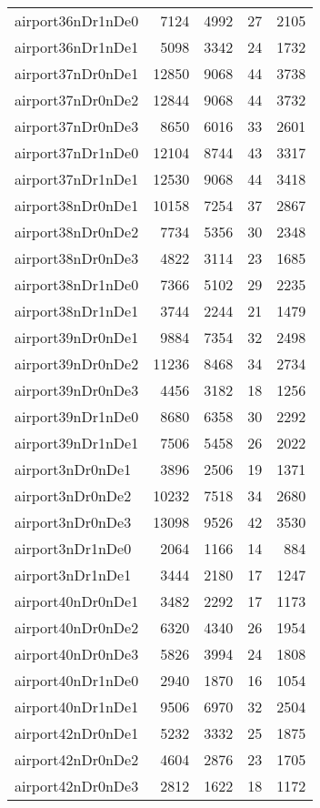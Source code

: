 \begin{tabular}{lrrrr}
airport36nDr1nDe0 & 7124 & 4992 & 27 & 2105 \\
airport36nDr1nDe1 & 5098 & 3342 & 24 & 1732 \\
airport37nDr0nDe1 & 12850 & 9068 & 44 & 3738 \\
airport37nDr0nDe2 & 12844 & 9068 & 44 & 3732 \\
airport37nDr0nDe3 & 8650 & 6016 & 33 & 2601 \\
airport37nDr1nDe0 & 12104 & 8744 & 43 & 3317 \\
airport37nDr1nDe1 & 12530 & 9068 & 44 & 3418 \\
airport38nDr0nDe1 & 10158 & 7254 & 37 & 2867 \\
airport38nDr0nDe2 & 7734 & 5356 & 30 & 2348 \\
airport38nDr0nDe3 & 4822 & 3114 & 23 & 1685 \\
airport38nDr1nDe0 & 7366 & 5102 & 29 & 2235 \\
airport38nDr1nDe1 & 3744 & 2244 & 21 & 1479 \\
airport39nDr0nDe1 & 9884 & 7354 & 32 & 2498 \\
airport39nDr0nDe2 & 11236 & 8468 & 34 & 2734 \\
airport39nDr0nDe3 & 4456 & 3182 & 18 & 1256 \\
airport39nDr1nDe0 & 8680 & 6358 & 30 & 2292 \\
airport39nDr1nDe1 & 7506 & 5458 & 26 & 2022 \\
airport3nDr0nDe1 & 3896 & 2506 & 19 & 1371 \\
airport3nDr0nDe2 & 10232 & 7518 & 34 & 2680 \\
airport3nDr0nDe3 & 13098 & 9526 & 42 & 3530 \\
airport3nDr1nDe0 & 2064 & 1166 & 14 & 884 \\
airport3nDr1nDe1 & 3444 & 2180 & 17 & 1247 \\
airport40nDr0nDe1 & 3482 & 2292 & 17 & 1173 \\
airport40nDr0nDe2 & 6320 & 4340 & 26 & 1954 \\
airport40nDr0nDe3 & 5826 & 3994 & 24 & 1808 \\
airport40nDr1nDe0 & 2940 & 1870 & 16 & 1054 \\
airport40nDr1nDe1 & 9506 & 6970 & 32 & 2504 \\
airport42nDr0nDe1 & 5232 & 3332 & 25 & 1875 \\
airport42nDr0nDe2 & 4604 & 2876 & 23 & 1705 \\
airport42nDr0nDe3 & 2812 & 1622 & 18 & 1172 \\

\end{tabular}
